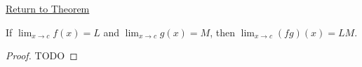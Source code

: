 \newpage
{}
\label{prf:product-rule-function-limits}

\begin{remark*}[Return]
\hyperref[thm:product-rule-function-limits]{Return to Theorem}
\end{remark*}

\begin{theorem*}
If $\lim_{x\to c}f(x)=L$ and $\lim_{x\to c}g(x)=M$, then $\lim_{x\to c}(fg)(x)=LM$.
\end{theorem*}

\begin{proof}
TODO
\end{proof}
